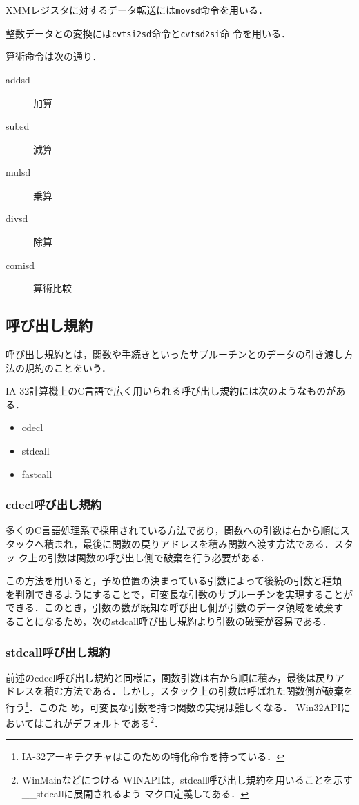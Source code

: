 \documentclass[a4paper,titlepage,disablejfam]{jsbook}
\begin{document}
XMMレジスタに対するデータ転送には\lstinline|movsd|命令を用いる．

整数データとの変換には\lstinline|cvtsi2sd|命令と\lstinline|cvtsd2si|命
令を用いる．

算術命令は次の通り．
\begin{description}
 \item[addsd] 加算
 \item[subsd] 減算
 \item[mulsd] 乗算
 \item[divsd] 除算
 \item[comisd] 算術比較
\end{description}

\subsection{呼び出し規約}\label{ssc:calling-convention}
呼び出し規約とは，関数や手続きといったサブルーチンとのデータの引き渡し方
法の規約のことをいう．

IA-32計算機上のC言語で広く用いられる呼び出し規約には次のようなものがある．
\begin{itemize}
 \item cdecl
 \item stdcall
 \item fastcall
\end{itemize}

\subsubsection{cdecl呼び出し規約}
多くのC言語処理系で採用されている方法であり，関数への引数は右から順にス
タックへ積まれ，最後に関数の戻りアドレスを積み関数へ渡す方法である．スタッ
ク上の引数は関数の呼び出し側で破棄を行う必要がある．

この方法を用いると，予め位置の決まっている引数によって後続の引数と種類
を判別できるようにすることで，可変長な引数のサブルーチンを実現することが
できる．このとき，引数の数が既知な呼び出し側が引数のデータ領域を破棄す
ることになるため，次のstdcall呼び出し規約より引数の破棄が容易である．

\subsubsection{stdcall呼び出し規約}
前述のcdecl呼び出し規約と同様に，関数引数は右から順に積み，最後は戻りア
ドレスを積む方法である．しかし，スタック上の引数は呼ばれた関数側が破棄を
行う\footnote{IA-32アーキテクチャはこのための特化命令を持っている．}．このた
め，可変長な引数を持つ関数の実現は難しくなる．
Win32APIにおいてはこれがデフォルトである\footnote{WinMainなどにつける
WINAPIは，stdcall呼び出し規約を用いることを示す\_\_stdcallに展開されるよう
マクロ定義してある．}．
\end{document}
